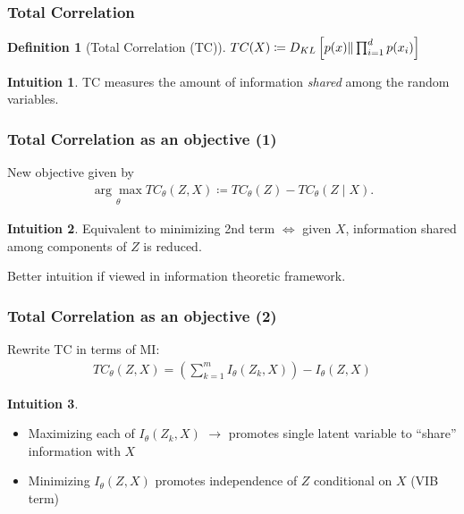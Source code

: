 \documentclass{beamer}
\theoremstyle{definition}
\newtheorem{definition}[section]{Definition}
\newtheorem{intuition}{Intuition}
\begin{document}
    \begin{frame}
      \frametitle{Total Correlation}
      \begin{definition}[Total Correlation (TC)]
        $TC(X) \coloneqq D_{KL}\left[p(x) \large  \Vert \prod_{i=1}^{d}p(x_{i})\right] $

      \end{definition}
      \begin{intuition}
        TC measures the amount of information \textit{shared} among the random variables.
      \end{intuition}
    \end{frame}

    \begin{frame}
      \frametitle{Total Correlation as an objective (1)}
      New objective given by
      \begin{align*}
        \underset{\theta}{\arg \max}TC_{\theta}(Z, X) \coloneqq TC_{\theta}(Z) - TC_{\theta}(Z \mid X).
      \end{align*}
      \begin{intuition}
        Equivalent to minimizing 2nd term $\iff$ given $X$, information shared among components of $Z$ is reduced.
      \end{intuition}
      Better  intuition if viewed in information theoretic framework.
    \end{frame}

    \begin{frame}
      \frametitle{Total Correlation as an objective (2)}
      Rewrite TC in terms of MI:
      \begin{align*}
        TC_{\theta}(Z, X) = \left(\sum_{k=1}^{m}I_{\theta}(Z_{k}, X)\right) - I_{\theta}(Z, X)
      \end{align*}
      \begin{intuition}
        \begin{itemize}
          \item Maximizing each of $I_{\theta}(Z_{k}, X)$ $\to$ promotes single latent variable to \enquote{share} information with $X$
          \item Minimizing $I_{\theta}(Z, X)$ promotes independence of $Z$ conditional on $X$ (VIB term)

        \end{itemize}
      \end{intuition}
    \end{frame}
\end{document}
